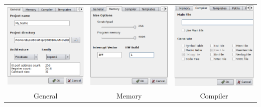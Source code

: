     \begin{table}[h!]
        \begin{tabular}{ccc}
            \includegraphics[width=.33\textwidth]{img/NewImg/project_1.png}
                &
            \includegraphics[width=.33\textwidth]{img/NewImg/project_2.png}
                &
            \includegraphics[width=.33\textwidth]{img/NewImg/project_3.png}
                \\
            General & Memory & Compiler
        \end{tabular}
    \end{table}

